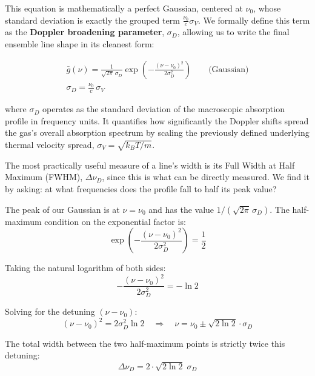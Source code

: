 This equation is mathematically a perfect Gaussian, centered at $\nu_0$, whose standard deviation is exactly the grouped term $\frac{\nu_0}{c}\sigma_V$. We formally define this term as the \textbf{Doppler broadening parameter}, $\sigma_D$, allowing us to write the final ensemble line shape in its cleanest form:
\begin{keyresult}
    \begin{gather}
        \bar{g}(\nu) = \frac{1}{\sqrt{2\pi}\,\sigma_D}\exp\!\left(-\frac{(\nu-\nu_0)^2}{2\sigma_D^2}\right) \qquad \text{(Gaussian)} \\[1ex]
        \sigma_D = \frac{\nu_0}{c}\,\sigma_V \nonumber
    \end{gather}
\end{keyresult}
where $\sigma_D$ operates as the standard deviation of the macroscopic absorption profile in frequency units. It quantifies how significantly the Doppler shifts spread the gas's overall absorption spectrum by scaling the previously defined underlying thermal velocity spread, $\sigma_V = \sqrt{k_BT/m}$.

The most practically useful measure of a line's width is its Full Width at Half Maximum (FWHM), $\Delta\nu_D$, since this is what can be directly measured. We find it by asking: at what frequencies does the profile fall to half its peak value?

The peak of our Gaussian is at $\nu = \nu_0$ and has the value $1/(\sqrt{2\pi}\,\sigma_D)$. The half-maximum condition on the exponential factor is:
\begin{equation*}
    \exp\!\left(-\frac{(\nu-\nu_0)^2}{2\sigma_D^2}\right) = \frac{1}{2}
\end{equation*}

Taking the natural logarithm of both sides:
\begin{equation*}
    -\frac{(\nu-\nu_0)^2}{2\sigma_D^2} = -\ln 2
\end{equation*}

Solving for the detuning $(\nu - \nu_0)$:
\begin{equation*}
    (\nu-\nu_0)^2 = 2\sigma_D^2\ln 2 \quad\Longrightarrow\quad \nu = \nu_0 \pm \sqrt{2\ln 2}\cdot\sigma_D
\end{equation*}

The total width between the two half-maximum points is strictly twice this detuning:
\begin{equation*}
    \Delta\nu_D = 2 \cdot \sqrt{2\ln 2}\;\sigma_D
\end{equation*}

